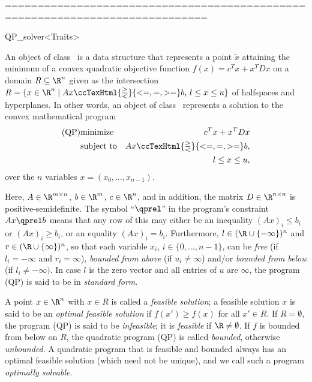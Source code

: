  =============================================================================
\begin{ccRefClass}{QP_solver<Traits>}

\ccDefinition An object of class \ccRefName\ is a data structure
that represents a point $\tilde{x}$ attaining the minimum of a convex
quadratic objective function $f(x)=c^{T}x+x^{T}Dx$ on
a domain $R \subseteq \R^{n}$ given as the intersection $R=\{ x\in\R^n
\mid \mbox{$Ax\ccTexHtml{\gtreqless}{<=,=,>=} b$, $l \le x \le u$}\}$ of halfspaces and
hyperplanes. In other words, an object of class \ccRefName\ represents
a solution to the convex mathematical program
\begin{eqnarray*}
\mbox{(QP)}&\mbox{minimize} & c^{T}x+x^{T}Dx \\
&\mbox{subject to}   & Ax\ccTexHtml{\gtreqless}{<=,=,>=}  b, \\
&& l \leq x \leq u,
\end{eqnarray*}
over the $n$ variables $x=(x_0,\ldots,x_{n-1})$.

Here, $A \in \R^{m \times n}$, $b \in \R^{m}$, $c \in \R^{n}$, and in
addition, the matrix $D \in \R^{n \times n}$ is positive-semidefinite.
The symbol ``$\qprel$'' in the program's constraint 
$Ax \qprel b$ means that any row of this may either be an inequality $(Ax)_i \leq b_i$ or
$(Ax)_i \geq b_i$, or an equality $(Ax)_i = b_i$.  Furthermore, $l\in
(\R\cup\{-\infty\})^n$ and $r\in (\R\cup\{\infty\})^n$, so that each
variable $x_i$, $i\in\{0,\ldots,n-1\}$, can be \emph{free} (if
$l_i=-\infty$ and $r_i=\infty$), \emph{bounded from above} (if
$u_i\not=\infty$) and/or \emph{bounded from below} (if
$l_i\not=-\infty)$.  In case $l$ is the zero vector and all entries of
$u$ are $\infty$, the program (QP) is said to be in \emph{standard
form}.

A point $x \in \R^{n}$ with $x\in R$ is called a \emph{feasible
solution}; a feasible solution $x$ is said to be an \emph{optimal
feasible solution} if $f(x')\geq f(x)$ for all $x'\in R$.  If
$R=\emptyset$, the program (QP) is said to be \emph{infeasible};
it is \emph{feasible} if $\R\not=\emptyset$.  If $f$ is bounded from
below on $R$, the quadratic program (QP) is called \emph{bounded},
otherwise \emph{unbounded}.  A quadratic program that is feasible and
bounded always has an optimal feasible solution (which need not be
unique), and we call such a program \emph{optimally solvable}.


\end{ccRefClass}
